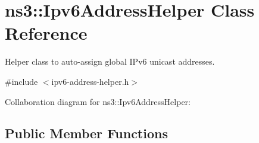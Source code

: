 \hypertarget{classns3_1_1Ipv6AddressHelper}{}\section{ns3\+:\+:Ipv6\+Address\+Helper Class Reference}
\label{classns3_1_1Ipv6AddressHelper}


Helper class to auto-\/assign global I\+Pv6 unicast addresses.  




{\ttfamily \#include $<$ipv6-\/address-\/helper.\+h$>$}



Collaboration diagram for ns3\+:\+:Ipv6\+Address\+Helper\+:
\subsection*{Public Member Functions}
